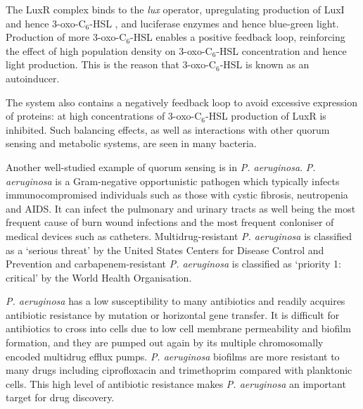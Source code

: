 The LuxR complex binds to the \textit{lux} operator, upregulating production of LuxI and hence 3-oxo-C$_6$-HSL , and luciferase enzymes and hence blue-green light\cite{Devine1989,Engebrecht1983,Visick2000}.
Production of more 3-oxo-C$_6$-HSL  enables a positive feedback loop, reinforcing the effect of high population density on 3-oxo-C$_6$-HSL  concentration and hence light production.
This is the reason that 3-oxo-C$_6$-HSL  is known as an autoinducer.

The system also contains a negatively feedback loop to avoid excessive expression of proteins: at high concentrations of 3-oxo-C$_6$-HSL  production of LuxR is inhibited\cite{Dunlap1989}. Such balancing effects, as well as interactions with other quorum sensing and metabolic systems, are seen in many bacteria\cite{Dubern2008,Miller2001}.


Another well-studied example of quorum sensing is in \textit{P. aeruginosa}\cite{Dubern2008,Hodgkinson2011,Jimenez2012}.
\textit{P. aeruginosa} is a Gram-negative opportunistic pathogen which typically infects immunocompromised individuals such as those with cystic fibrosis, neutropenia and AIDS. It can infect the pulmonary and urinary tracts as well being the most frequent cause of burn wound infections and the most frequent conloniser of medical devices such as catheters\cite{Bodey1983}. Multidrug-resistant \textit{P. aeruginosa} is classified as a `serious threat' by the United States Centers for Disease Control and Prevention\cite{ResistanceUS} and carbapenem-resistant \textit{P. aeruginosa} is classified as `priority 1: critical' by the World Health Organisation\cite{WHO}.

\textit{P. aeruginosa} has a low susceptibility to many antibiotics and readily acquires antibiotic resistance by mutation or horizontal gene transfer\cite{Cornelis2008}.
It is difficult for antibiotics to cross into cells due to low cell membrane permeability\cite{Nikaido1989} and biofilm formation\cite{Evans1991}, and they are pumped out again by its multiple chromosomally encoded multidrug efflux pumps\cite{Poole2004}.
\textit{P. aeruginosa} biofilms are more resistant to many drugs including ciprofloxacin  and trimethoprim  compared with planktonic cells\cite{Evans1991,Olson2002}.
This high level of antibiotic resistance makes \textit{P. aeruginosa} an important target for drug discovery.

